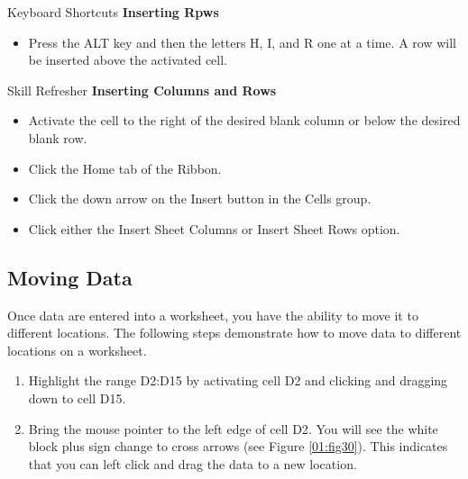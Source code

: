 \begin{center}
	\begin{shtcutbox}{Keyboard Shortcuts}
		\textbf{Inserting Rpws}
		\\
		\begin{itemize}
			\setlength{\itemsep}{0pt}
			\setlength{\parskip}{0pt}
			\setlength{\parsep}{0pt}
			
			\item Press the ALT key and then the letters H, I, and R one at a time. A row will be inserted above the activated cell.
			
		\end{itemize}
	\end{shtcutbox}
\end{center}

\begin{center}
	\begin{sklbox}{Skill Refresher}
		\textbf{Inserting Columns and Rows}
		\\
		\begin{itemize}
			\setlength{\itemsep}{0pt}
			\setlength{\parskip}{0pt}
			\setlength{\parsep}{0pt}
			
			\item Activate the cell to the right of the desired blank column or below the desired blank row.
			\item Click the Home tab of the Ribbon.
			\item Click the down arrow on the Insert button in the Cells group.
			\item Click either the Insert Sheet Columns or Insert Sheet Rows option.
			
		\end{itemize}
	\end{sklbox}
\end{center}


\subsection{Moving Data}

Once data are entered into a worksheet, you have the ability to move it to different locations. The following steps demonstrate how to move data to different locations on a worksheet.

\begin{enumerate}
	\item Highlight the range \textsf{D2:D15} by activating cell \textsf{D2} and clicking and dragging down to cell \textsf{D15}.
	\item Bring the mouse pointer to the left edge of cell \textsf{D2}. You will see the white block plus sign change to cross arrows (see Figure \ref{01:fig30}). This indicates that you can left click and drag the data to a new location.
\end{enumerate}

